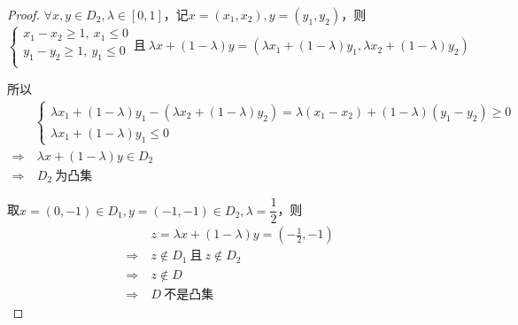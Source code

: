 \documentclass[12pt, a4paper, oneside]{ctexart}
\begin{document}
\begin{proof}
    $\forall x, y\in D_2, \lambda\in[0, 1]$，记$x=(x_1,x_2), y=(y_1,y_2)$，则
    \begin{equation*}
        \begin{cases}
            x_1-x_2\geqslant 1,\ x_1\leqslant 0\\
            y_1-y_2\geqslant 1,\ y_1\leqslant 0\\
        \end{cases}
        \text{且}\ \lambda x + (1-\lambda) y = (\lambda x_1+(1-\lambda)y_1, \lambda x_2+(1-\lambda) y_2)
    \end{equation*}

    所以
    \begin{equation*}
        \begin{aligned}
            &\begin{cases}
                \lambda x_1+(1-\lambda)y_1- (\lambda x_2+(1-\lambda) y_2)=\lambda(x_1-x_2)+(1-\lambda)(y_1-y_2)\geqslant 0\\
                \lambda x_1+(1-\lambda) y_1\leqslant 0
            \end{cases}\\
            \Rightarrow &\ \lambda x+(1-\lambda)y\in D_2\\
            \Rightarrow &\ D_2\ \text{为凸集}
        \end{aligned}
    \end{equation*}

    取$x=(0, -1)\in D_1, y=(-1,-1)\in D_2, \lambda = \dfrac{1}{2}$，则
    \begin{equation*}
        \begin{aligned}
            &\ z = \lambda x + (1-\lambda)y = (-\frac{1}{2}, -1)\\
            \Rightarrow &\ z\notin D_1\ \text{且}\ z\notin D_2\\
            \Rightarrow &\ z\notin D\\
            \Rightarrow &\ D\ \text{不是凸集}
        \end{aligned}
    \end{equation*}
\end{proof}
\end{document}
